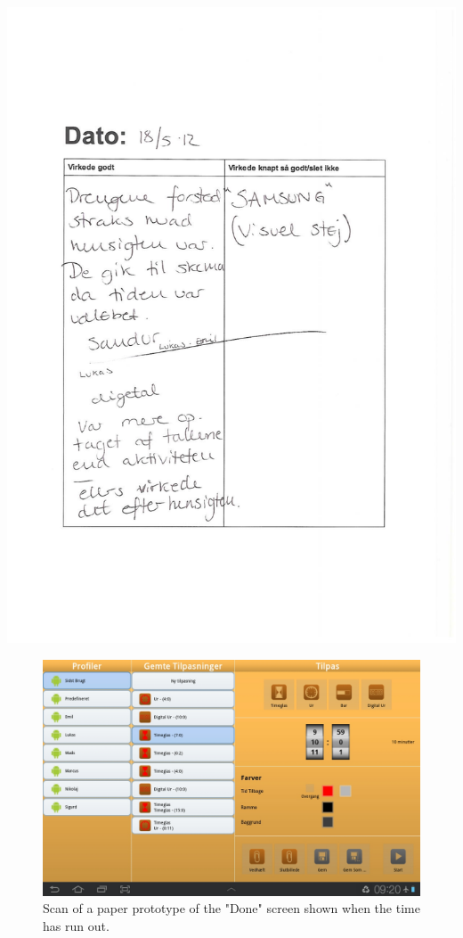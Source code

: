 \begin{center}
		\includegraphics[width=\textwidth]{Development/Acceptance_diary/Diary_2.pdf}
	\end{center}
	
	\begin{figure}[H]
		\centering
			\includegraphics[width=\textwidth]{Images/Screenshots/last_used.png}
				\caption{Scan of a paper prototype of the "Done" screen shown when the time has run out.}
		\label{fig:last_used_screenshot}
	\end{figure}
	

